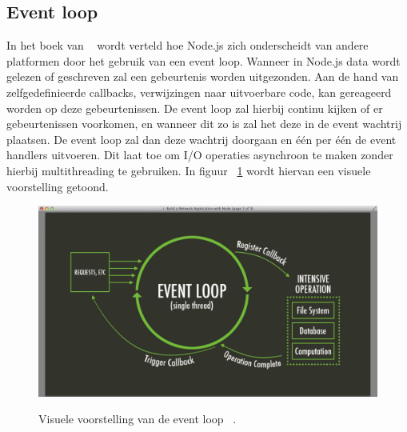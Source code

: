 \subsection{Event loop}
In het boek van ~\textcite{Ali2013} wordt verteld hoe Node.js zich onderscheidt van andere platformen door het gebruik van een event loop.
Wanneer in Node.js data wordt gelezen of geschreven zal een gebeurtenis worden uitgezonden. 
Aan de hand van zelfgedefinieerde callbacks, verwijzingen naar uitvoerbare code, kan gereageerd worden op deze gebeurtenissen. 
De event loop zal hierbij continu kijken of er gebeurtenissen voorkomen, en wanneer dit zo is zal het deze in de event wachtrij plaatsen.
De event loop zal dan deze wachtrij doorgaan en één per één de event handlers uitvoeren. 
Dit laat toe om I/O operaties asynchroon te maken zonder hierbij multithreading te gebruiken.
In figuur ~\ref{fig:eventloop} wordt hiervan een visuele voorstelling getoond.
\begin{figure}[h]
    \centering
    \includegraphics[width=.9\textwidth]{graphics/eventloop.png}
    \caption{\label{fig:eventloop}}Visuele voorstelling van de event loop ~\autocite{Luxembourg2023}.
\end{figure}

